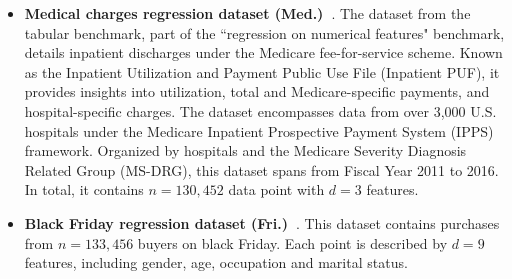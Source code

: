\begin{itemize}
    \item \textbf{Medical charges regression dataset (Med.)~\citep{grinsztajn2022tree}}. The dataset from the tabular benchmark, part of the ``regression on numerical features" benchmark, details inpatient discharges under the Medicare fee-for-service scheme. Known as the Inpatient Utilization and Payment Public Use File (Inpatient PUF), it provides insights into utilization, total and Medicare-specific payments, and hospital-specific charges. The dataset encompasses data from over 3,000 U.S. hospitals under the Medicare Inpatient Prospective Payment System (IPPS) framework. Organized by hospitals and the Medicare Severity Diagnosis Related Group (MS-DRG), this dataset spans from Fiscal Year 2011 to 2016. In total, it contains $n=130,452$ data point with $d=3$ features.
    \item \textbf{Black Friday regression dataset (Fri.)~\citep{grinsztajn2022tree}}. This dataset contains purchases from $n=133,456$ buyers on black Friday. Each point is described by $d=9$ features, including gender, age, occupation and marital status.
    

\end{itemize}

